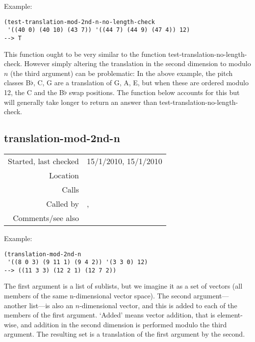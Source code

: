 \vspace{0.5cm}
\noindent Example:
\begin{verbatim}
(test-translation-mod-2nd-n-no-length-check
 '((40 0) (40 10) (43 7)) '((44 7) (44 9) (47 4)) 12)
--> T
\end{verbatim}

\noindent This function ought to be very similar to
the function test-translation-no-length-check.
However simply altering the translation in the second
dimension to modulo $n$ (the third argument) can be
problematic: In the above example, the pitch classes
B$\flat$, C, G are a translation of G, A, E, but
when these are ordered modulo 12, the C and the
B$\flat$ swap positions. The function below accounts
for this but will generally take longer to return an
answer than test-translation-no-length-check.


\subsection*{translation-mod-2nd-n}\label{fun:translation-mod-2nd-n}

\vspace{0.3cm}
\begin{tabular}{r|p{8cm}}
Started, last checked & 15/1/2010, 15/1/2010 \\
Location & \nameref{sec:structural-induction-mod} \\
Calls & \nameref{fun:add-two-lists-mod-2nd-n} \\
Called by & \nameref{fun:test-translation-mod-2nd-n-no-length-check}, \nameref{fun:translations-mod-2nd-n} \\
Comments/see also & \nameref{fun:translation}
\end{tabular}

\vspace{0.5cm}
\noindent Example:
\begin{verbatim}
(translation-mod-2nd-n
 '((8 0 3) (9 11 1) (9 4 2)) '(3 3 0) 12)
--> ((11 3 3) (12 2 1) (12 7 2))
\end{verbatim}

\noindent The first argument is a list of sublists,
but we imagine it as a set of vectors (all members of
the same n-dimensional vector space). The second
argument---another list---is also an $n$-dimensional
vector, and this is added to each of the members of
the first argument. `Added' means vector addition,
that is element-wise, and addition in the second
dimension is performed modulo the third argument. The
resulting set is a translation of the first argument
by the second.


